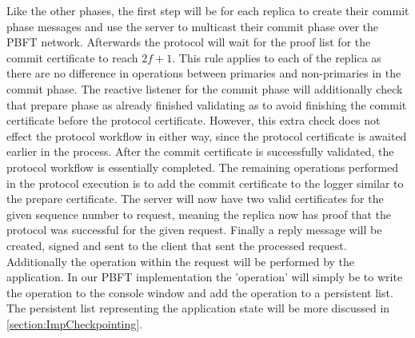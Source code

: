 Like the other phases, the first step will be for each replica to create their commit phase messages and use the server to multicast their commit phase over the PBFT network. Afterwards the protocol will wait for the proof list for the commit certificate to reach $2f+1$. This rule applies to each of the replica as there are no difference in operations between primaries and non-primaries in the commit phase. The reactive listener for the commit phase will additionally check that prepare phase as already finished validating as to avoid finishing the commit certificate before the protocol certificate. However, this extra check does not effect the protocol workflow in either way, since the protocol certificate is awaited earlier in the process. After the commit certificate is successfully validated, the protocol workflow is essentially completed. The remaining operations performed in the protocol execution is to add the commit certificate to the logger similar to the prepare certificate. The server will now have two valid certificates for the given sequence number to request, meaning the replica now has proof that the protocol was successful for the given request. Finally a reply message will be created, signed and sent to the client that sent the processed request. Additionally the operation within the request will be performed by the application. In our PBFT implementation the 'operation' will simply be to write the operation to the console window and add the operation to a persistent list. The persistent list representing the application state will be more discussed in \autoref{section:ImpCheckpointing}.

